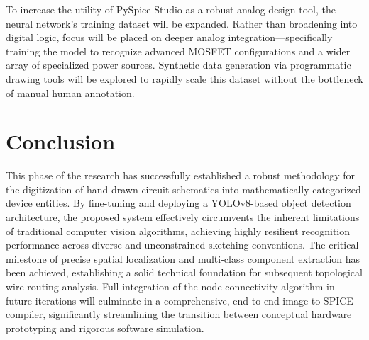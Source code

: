 \documentclass[12pt]{article}
\begin{document}
To increase the utility of PySpice Studio as a robust analog design tool, the neural network's training dataset will be expanded. Rather than broadening into digital logic, focus will be placed on deeper analog integration—specifically training the model to recognize advanced MOSFET configurations and a wider array of specialized power sources. Synthetic data generation via programmatic drawing tools will be explored to rapidly scale this dataset without the bottleneck of manual human annotation.


\section{Conclusion}

This phase of the research has successfully established a robust methodology for the digitization of hand-drawn circuit schematics into mathematically categorized device entities. By fine-tuning and deploying a YOLOv8-based object detection architecture, the proposed system effectively circumvents the inherent limitations of traditional computer vision algorithms, achieving highly resilient recognition performance across diverse and unconstrained sketching conventions. The critical milestone of precise spatial localization and multi-class component extraction has been achieved, establishing a solid technical foundation for subsequent topological wire-routing analysis. Full integration of the node-connectivity algorithm in future iterations will culminate in a comprehensive, end-to-end image-to-SPICE compiler, significantly streamlining the transition between conceptual hardware prototyping and rigorous software simulation.
\end{document}
